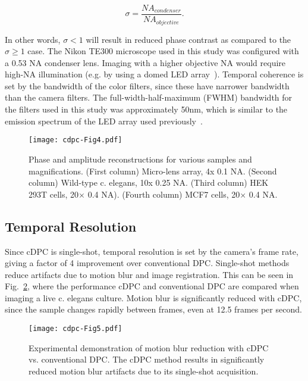 \begin{equation}
\sigma = \frac{NA_{condenser}}{NA_{objective}}.
\end{equation}

\noindent In other words, $\sigma < 1$ will result in reduced phase contrast as compared to the $\sigma \geq 1$ case. The Nikon TE300 microscope used in this study was configured with a 0.53 NA condenser lens. Imaging with a higher objective NA would require high-NA illumination (e.g. by using a domed LED array~\cite{Phillips15}). Temporal coherence is set by the bandwidth of the color filters, since these have narrower bandwidth than the camera filters. The full-width-half-maximum (FWHM) bandwidth for the filters used in this study was approximately 50nm, which is similar to the emission spectrum of the LED array used previously~\cite{tian2015quantitative}.

\begin{figure}[ph]
\centering
\texttt{[image: cdpc-Fig4.pdf]}
\caption{\label{fig:mosaic}
Phase and amplitude reconstructions for various samples and magnifications. (First column) Micro-lens array, 4x 0.1 NA. (Second column) Wild-type c. elegans, 10x 0.25 NA. (Third column) HEK 293T cells, 20$\times$ 0.4 NA). (Fourth column) MCF7 cells, 20$\times$ 0.4 NA.}
\end{figure}

\clearpage


\subsection{Temporal Resolution}
Since cDPC is single-shot, temporal resolution is set by the camera's frame rate, giving a factor of 4 improvement over conventional DPC. Single-shot methods reduce artifacts due to motion blur and image registration. This can be seen in Fig.~\ref{fig:temporalRes}, where the performance cDPC and conventional DPC are compared when imaging a live c. elegans culture. Motion blur is significantly reduced with cDPC, since the sample changes rapidly between frames, even at 12.5 frames per second.

\begin{figure}[tbh]
\centering
\texttt{[image: cdpc-Fig5.pdf]}
\caption{\label{fig:temporalRes}
Experimental demonstration of motion blur reduction with cDPC vs. conventional DPC. The cDPC method results in significantly reduced motion blur artifacts due to its single-shot acquisition.}
\end{figure}

